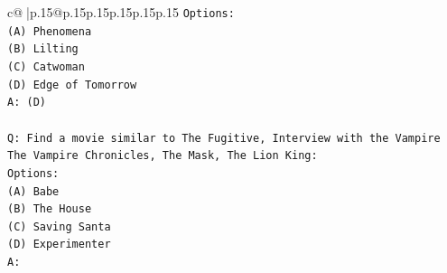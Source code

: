 \documentclass{article}
\begin{document}
{\begin{supertabular}{c@{$\;$}|p{.15\linewidth}@{}p{.15\linewidth}p{.15\linewidth}p{.15\linewidth}p{.15\linewidth}p{.15\linewidth}}
{{{\texttt{Options:} \\
\texttt{(A) Phenomena} \\
\texttt{(B) Lilting} \\
\texttt{(C) Catwoman} \\
\texttt{(D) Edge of Tomorrow} \\
\texttt{A: (D)} \\
\\ 
\texttt{Q: Find a movie similar to The Fugitive, Interview with the Vampire The Vampire Chronicles, The Mask, The Lion King:} \\
\texttt{Options:} \\
\texttt{(A) Babe} \\
\texttt{(B) The House} \\
\texttt{(C) Saving Santa} \\
\texttt{(D) Experimenter} \\
\texttt{A:} \\
            }
        }
    }
     \\ \\


\end{supertabular}}
\end{document}
